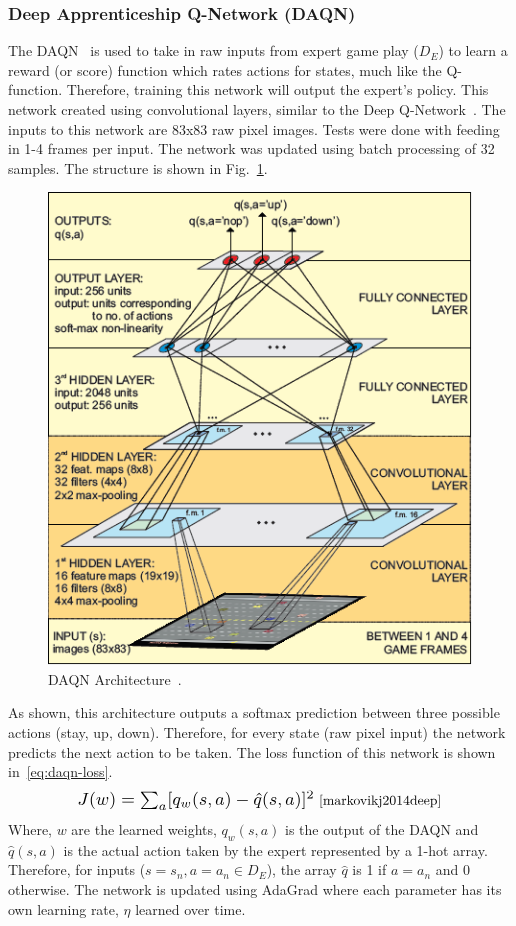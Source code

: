 \documentclass[12pt,american]{report}
\begin{document}
\subsubsection{Deep Apprenticeship Q-Network (DAQN)}
The DAQN~\cite{markovikj2014deep} is used to take in raw inputs from expert game play ($D_E$) to learn a reward (or score) function which rates actions for states, much like the Q-function. Therefore, training this network will output the expert's policy. This network created using convolutional layers, similar to the Deep Q-Network~\cite{atari}. The inputs to this network are 83x83 raw pixel images.  Tests were done with feeding in 1-4 frames per input. The network was updated using batch processing of 32 samples. The structure is shown in Fig.~\ref{fig:daqn-dal}.
\begin{figure}
\centering
\includegraphics[scale=.85]{images/daqn-dal.png}
\caption{DAQN Architecture~\cite{markovikj2014deep}.}
\label{fig:daqn-dal}
\end{figure}
As shown, this architecture outputs a softmax prediction between three possible actions (stay, up, down).  Therefore, for every state (raw pixel input) the network predicts the next action to be taken. The loss function of this network is shown in~\ref{eq:daqn-loss}.
\begin{equation}
     \label{eq:daqn-loss}
     \resizebox{0.5\textwidth}{!}{$J(w) =\sum_{a}[q_w(s,a)-\hat{q}(s,a)]^2$}~\cite{markovikj2014deep}%
\end{equation}
Where, $w$ are the learned weights, $q_w(s,a)$ is the output of the DAQN and $\hat{q}(s,a)$ is the actual action taken by the expert represented by a 1-hot array.  Therefore, for inputs ($s=s_n,a=a_n \in D_E$), the array $\hat{q}$ is 1 if $a = a_n$ and 0 otherwise. The network is updated using AdaGrad where each parameter has its own learning rate, $\eta$ learned over time.
\end{document}

